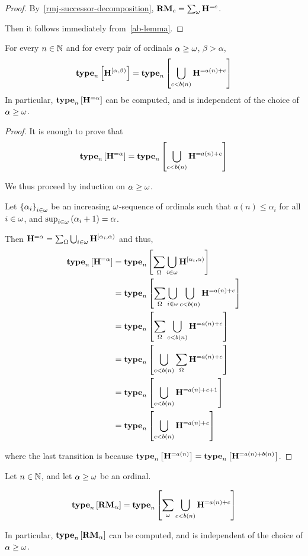 \begin{proof}
    By~\cref{rmj-successor-decomposition}, $\mathbf{RM}_{c} = \sum_{\omega}{\mathbf{H}^{= c}}$.

    Then it follows immediately from~\cref{ab-lemma}.
\end{proof}

\begin{lemma}
    For every $n \in \mathbb{N}$ and for every pair of ordinals $\alpha \ge \omega$,
    $\beta > \alpha$,
    \[
        \mathbf{type}_{n} \left[ {\mathbf{H}^{[\alpha, \beta)}} \right] = \mathbf{type}_{n} \left[ {\bigcup_{c < b(n)}{\mathbf{H}^{= a(n) + c}}} \right]
    \]
    In particular, $\mathbf{type}_{n} \left[ {\mathbf{H}^{= \alpha}} \right]$ can be computed,
    and is independent of the choice of $\alpha \ge \omega$.
\end{lemma}

\begin{proof}
    It is enough to prove that
    \[
        \mathbf{type}_{n} \left[ {\mathbf{H}^{= \alpha}} \right] = \mathbf{type}_{n} \left[ {\bigcup_{c < b(n)}{\mathbf{H}^{= a(n) + c}}} \right]
    \]

    We thus proceed by induction on $\alpha \ge \omega$.

    Let $\left\{ {\alpha_i} \right\}_{i \in \omega}$ be an increasing $\omega$-sequence of ordinals
    such that $a(n) \le \alpha_i$ for all $i \in \omega$,
    and $\sup_{i \in \omega} \left( {\alpha_i + 1} \right) = \alpha$.

    Then $\mathbf{H}^{= \alpha} = \sum_{\Omega}{\bigcup_{i \in \omega} \mathbf{H}^{[\alpha_i, \alpha)}}$ and thus,
    \begin{align*}
        \mathbf{type}_{n} \left[ {\mathbf{H}^{= \alpha}} \right]
         & = \mathbf{type}_{n} \left[ {\sum_{\Omega} \bigcup_{i \in \omega} \mathbf{H}^{[\alpha_i, \alpha)}} \right]             \\
         & = \mathbf{type}_{n} \left[ {\sum_{\Omega} \bigcup_{i \in \omega} \bigcup_{c < b(n)}{\mathbf{H}^{= a(n) + c}}} \right] \\
         & = \mathbf{type}_{n} \left[ {\sum_{\Omega} \bigcup_{c < b(n)}{\mathbf{H}^{= a(n) + c}}} \right]                     \\
         & = \mathbf{type}_{n} \left[ {\bigcup_{c < b(n)}{\sum_{\Omega} \mathbf{H}^{= a(n) + c}}} \right]                     \\
         & = \mathbf{type}_{n} \left[ {\bigcup_{c < b(n)}{\mathbf{H}^{= a(n) + c + 1}}} \right]                            \\
         & = \mathbf{type}_{n} \left[ {\bigcup_{c < b(n)}{\mathbf{H}^{= a(n) + c}}} \right]
    \end{align*}

    where the last transition is because $\mathbf{type}_{n} \left[ {\mathbf{H}^{= a(n)}} \right] = \mathbf{type}_{n} \left[ {\mathbf{H}^{= a(n) + b(n)}} \right]$.
\end{proof}

\begin{lemma}
    Let $n \in \mathbb{N}$, and let $\alpha \ge \omega$ be an ordinal.

    \[
        \mathbf{type}_{n} \left[ {\mathbf{RM}_{\alpha}} \right]
        = \mathbf{type}_{n} \left[ {\sum_{\omega} {\bigcup_{c < b(n)}{\mathbf{H}^{= a(n) + c}}}} \right]
    \]

    In particular, $\mathbf{type}_{n} \left[ {\mathbf{RM}_{\alpha}} \right]$ can be
    computed, and is independent of the choice of $\alpha \ge \omega$.
\end{lemma}

